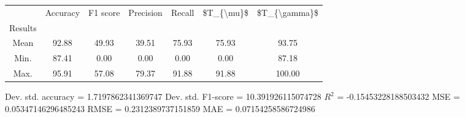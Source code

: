 \begin{tabular}{|c|c|c|c|c|c|c|}
\toprule
{} &  Accuracy &  F1 score &  Precision &  Recall &  \$T\_\{\textbackslash mu\}\$ &  \$T\_\{\textbackslash gamma\}\$ \\
Results &           &           &            &         &            &               \\
\hline
Mean    &     92.88 &     49.93 &      39.51 &   75.93 &      75.93 &         93.75 \\
Min.    &     87.41 &      0.00 &       0.00 &    0.00 &       0.00 &         87.18 \\
Max.    &     95.91 &     57.08 &      79.37 &   91.88 &      91.88 &        100.00 \\
\bottomrule
\end{tabular}

 Dev. std. accuracy = 1.7197862341369747
 Dev. std. F1-score = 10.391926115074728
 $R^2$ = -0.15453228188503432
 MSE = 0.05347146296485243
 RMSE = 0.2312389737151859
 MAE = 0.07154258586724986